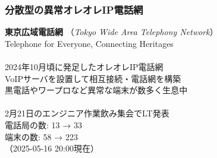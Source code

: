 \documentclass[
  lualatex,
  aspectratio=169,
  14pt
]{beamer}
\begin{document}
\begin{frame}
  \frametitle{分散型の異常オレオレIP電話網}

  \textbf{東京広域電話網}
  （\textit{Tokyo Wide Area Telephony Network}）\\
  \hspace{1.5\zw}Telephone for Everyone, Connecting Heritages
  \\~\\[-.5\baselineskip]

  2024年10月頃に発足したオレオレIP電話網\\
  \hspace{1.5\zw}VoIPサーバを設置して相互接続・電話網を構築\\
  \hspace{1.5\zw}黒電話やワープロなど異常な端末が数多く生息中
  \\~\\[-.5\baselineskip]

  2月21日のエンジニア作業飲み集会でLT発表\\
  \hspace{1.5\zw}電話局の数: 13 → 33\\
  \hspace{2.5\zw}端末の数: 58 → 223\\
  \hspace{1.5\zw}（2025-05-16 20:00現在）

\end{frame}
\end{document}
